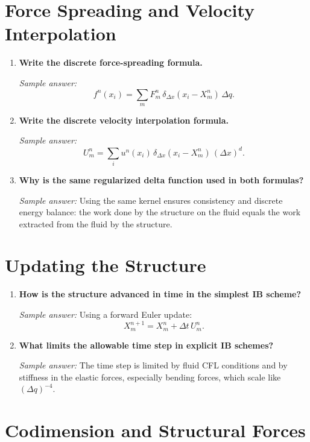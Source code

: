 \documentclass[11pt]{article}
\begin{document}
\section*{Force Spreading and Velocity Interpolation}

\begin{enumerate}[label=\arabic*., resume]

\item \textbf{Write the discrete force-spreading formula.}

\textit{Sample answer:}  
\[
f^n(x_i) = \sum_m F^n_m \, \delta_{\Delta x}(x_i - X^n_m)\, \Delta q.
\]

\item \textbf{Write the discrete velocity interpolation formula.}

\textit{Sample answer:}  
\[
U^n_m = \sum_i u^n(x_i)\, \delta_{\Delta x}(x_i - X^n_m)\, (\Delta x)^d.
\]

\item \textbf{Why is the same regularized delta function used in both formulas?}

\textit{Sample answer:}  
Using the same kernel ensures consistency and discrete energy balance: the work done by the structure on the fluid equals the work extracted from the fluid by the structure.

\end{enumerate}

\section*{Updating the Structure}

\begin{enumerate}[label=\arabic*., resume]

\item \textbf{How is the structure advanced in time in the simplest IB scheme?}

\textit{Sample answer:}  
Using a forward Euler update:
\[
X^{n+1}_m = X^n_m + \Delta t \, U^n_m.
\]

\item \textbf{What limits the allowable time step in explicit IB schemes?}

\textit{Sample answer:}  
The time step is limited by fluid CFL conditions and by stiffness in the elastic forces, especially bending forces, which scale like $(\Delta q)^{-4}$.

\end{enumerate}

\section*{Codimension and Structural Forces}
\end{document}
